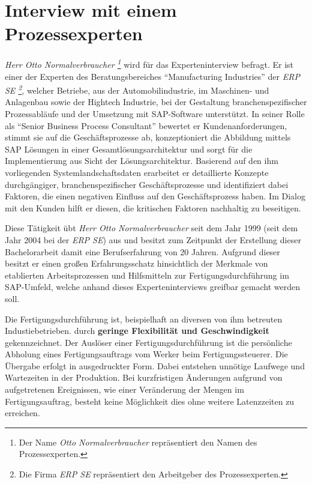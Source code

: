\tocless\section{Interview mit einem Prozessexperten}\label{ah:interviewCON}

\textit{Herr Otto Normalverbraucher \footnote{Der Name \textit{Otto Normalverbraucher} repräsentiert den Namen des Prozessexperten.}} wird für das Experteninterview befragt.
Er ist einer der Experten des Beratungsbereiches \enquote{Manufacturing Industries} der \textit{ERP SE \footnote{Die Firma \textit{ERP SE} repräsentiert den Arbeitgeber des Prozessexperten.}}, welcher Betriebe, aus der Automobilindustrie, im Maschinen- und Anlagenbau sowie der Hightech Industrie, bei der Gestaltung branchenspezifischer Prozessabläufe und der Umsetzung mit SAP-Software unterstützt.
In seiner Rolle als \enquote{Senior Business Process Consultant} bewertet er Kundenanforderungen, stimmt sie auf die Geschäftsprozesse ab, konzeptioniert die Abbildung mittels SAP Lösungen in einer Gesamtlösungsarchitektur und sorgt für die Implementierung aus Sicht der Lösungsarchitektur.
Basierend auf den ihm vorliegenden Systemlandschaftsdaten erarbeitet er detaillierte Konzepte durchgängiger, branchenspezifischer Geschäftsprozesse und identifiziert dabei Faktoren, die einen negativen Einfluss auf den Geschäftsprozess haben.
Im Dialog mit den Kunden hilft er diesen, die kritischen Faktoren nachhaltig zu beseitigen. 
 
Diese Tätigkeit übt \textit{Herr Otto Normalverbraucher} seit dem Jahr 1999 (seit dem Jahr 2004 bei der \textit{ERP SE}) aus und besitzt zum Zeitpunkt der Erstellung dieser Bachelorarbeit damit eine Berufserfahrung von 20 Jahren.
Aufgrund dieser besitzt er einen großen Erfahrungsschatz hinsichtlich der Merkmale von etablierten Arbeitsprozessen und Hilfsmitteln zur Fertigungsdurchführung im SAP-Umfeld, welche anhand dieses Experteninterviews greifbar gemacht werden soll.


\begin{definitionForm}[KA-P-1]
Die Fertigungsdurchführung ist, beispielhaft an diversen von ihm betreuten Industiebetrieben. durch \textbf{geringe Flexibilität und Geschwindigkeit} gekennzeichnet. Der Auslöser einer Fertigungsdurchführung ist die persönliche Abholung eines Fertigungsauftrags vom Werker beim Fertigungssteuerer. Die Übergabe erfolgt in ausgedruckter Form. Dabei entstehen unnötige Laufwege und Wartezeiten in der Produktion. Bei kurzfristigen Änderungen aufgrund von aufgetretenen Ereignissen, wie einer Veränderung der Mengen im Fertigungsauftrag, besteht keine Möglichkeit dies ohne weitere Latenzzeiten zu erreichen.
\end{definitionForm}

